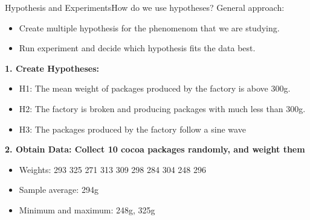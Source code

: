 \begin{frame}{Hypothesis and Experiments}{How do we use hypotheses?}
  General approach:
  \begin{itemize}
    \item Create multiple hypothesis for the phenomenom that we are studying.
    \item Run experiment and decide which hypothesis fits the data best.
  \end{itemize}\bigskip

  {\bf 1. Create Hypotheses:}
  \begin{itemize}
    \item H1: The mean weight of packages produced by the factory is above 300g.
    \item H2: The factory is broken and producing packages with much less than 300g.
    \item H3: The packages produced by the factory \alert{follow a sine wave}
  \end{itemize}\bigskip

  {\bf 2. Obtain Data: Collect 10 cocoa packages randomly, and weight them}
  \begin{itemize}
    \item Weights: 293 325 \alert{271} 313 309 298 284 304 \alert{248} 296
    \item Sample average: 294g\\
    \item Minimum and maximum: 248g, 325g\\
  \end{itemize}
\end{frame}



